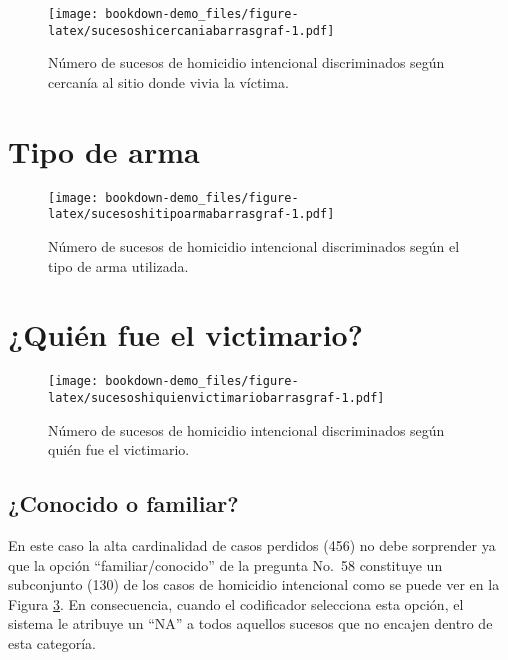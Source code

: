 \documentclass[
]{book}
\begin{document}
\begin{figure}
\centering
\texttt{[image: bookdown-demo\_files/figure-latex/sucesoshicercaniabarrasgraf-1.pdf]}
\caption{\label{fig:sucesoshicercaniabarrasgraf}Número de sucesos de homicidio intencional discriminados según cercanía al sitio donde vivia la víctima.}
\end{figure}

\hypertarget{tipo-de-arma}{%
\section{Tipo de arma}\label{tipo-de-arma}}



\begin{figure}
\centering
\texttt{[image: bookdown-demo\_files/figure-latex/sucesoshitipoarmabarrasgraf-1.pdf]}
\caption{\label{fig:sucesoshitipoarmabarrasgraf}Número de sucesos de homicidio intencional discriminados según el tipo de arma utilizada.}
\end{figure}

\hypertarget{quiuxe9n-fue-el-victimario}{%
\section{¿Quién fue el victimario?}\label{quiuxe9n-fue-el-victimario}}



\begin{figure}
\centering
\texttt{[image: bookdown-demo\_files/figure-latex/sucesoshiquienvictimariobarrasgraf-1.pdf]}
\caption{\label{fig:sucesoshiquienvictimariobarrasgraf}Número de sucesos de homicidio intencional discriminados según quién fue el victimario.}
\end{figure}

\hypertarget{conocido-o-familiar}{%
\subsection{¿Conocido o familiar?}\label{conocido-o-familiar}}

En este caso la alta cardinalidad de casos perdidos (456) no debe sorprender ya que la opción ``familiar/conocido'' de la pregunta No.~58 constituye un subconjunto (130) de los casos de homicidio intencional como se puede ver en la Figura \ref{fig:sucesoshiquienvictimariobarrasgraf}. En consecuencia, cuando el codificador selecciona esta opción, el sistema le atribuye un ``NA'' a todos aquellos sucesos que no encajen dentro de esta categoría.
\end{document}
